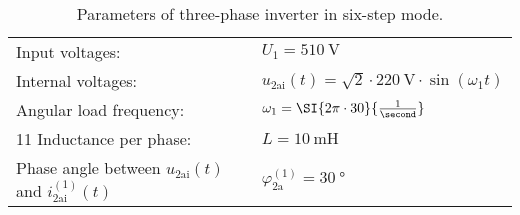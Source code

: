 

\begin{table}[ht]
    \centering  %
    \begin{tabular}{ll}
        \toprule
        Input voltages: & $U_\mathrm{1}=\SI{510}{\volt}$ \\
        Internal voltages: & $u_{\mathrm{2ai}}(t) = \sqrt{2} \cdot \SI{220}{\volt} \cdot \sin(\omega_1t)$ \\
        Angular load frequency: & $\omega_1 = \SI{2 \pi \cdot 30}{\frac{1}{\second}}$ \\ 11
        Inductance per phase: & $L= \SI{10}{\milli \henry}$ \\
        Phase angle between  $u_{\mathrm{2ai}}(t)$ and $i_{\mathrm{2ai}}^\mathrm{(1)}(t)$ & $\varphi_{\mathrm{2a}}^\mathrm{(1)}=\SI{30}{\degree}$ \\
        \bottomrule
    \end{tabular}
    \caption{Parameters of three-phase inverter in six-step mode.}  
    \label{table:ex07_Task2_ParametersOfTheCircuit}
\end{table}

